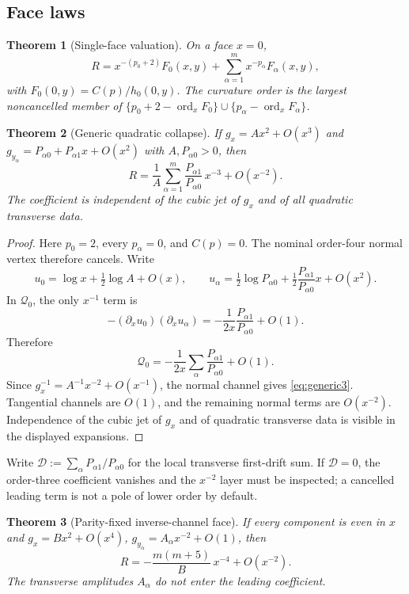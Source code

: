 \documentclass[11pt,a4paper]{article}
\newtheorem{theorem}{Theorem}[section]
\theoremstyle{definition}
\theoremstyle{remark}
\newcommand{\ord}{\operatorname{ord}}
\begin{document}
\subsection{Face laws}

\begin{theorem}[Single-face valuation]
\label{thm:singleface}
On a face \(x=0\),
\[
R
=
x^{-(p_0+2)}F_0(x,y)
+\sum_{\alpha=1}^{m}x^{-p_\alpha}F_\alpha(x,y),
\]
with \(F_0(0,y)=C(p)/h_0(0,y)\). The curvature order is the largest noncancelled
member of \(\{p_0+2-\ord_x F_0\}\cup\{p_\alpha-\ord_x F_\alpha\}\).
\end{theorem}

\begin{theorem}[Generic quadratic collapse]
\label{thm:generic3}
If \(g_x=Ax^2+O(x^3)\) and \(g_{y_\alpha}=P_{\alpha0}+P_{\alpha1}x+O(x^2)\) with
\(A,P_{\alpha0}>0\), then
\begin{equation}
\boxed{
R
=
\frac1A\sum_{\alpha=1}^{m}\frac{P_{\alpha1}}{P_{\alpha0}}\,x^{-3}
+O(x^{-2}).
}
\label{eq:generic3}
\end{equation}
The coefficient is independent of the cubic jet of \(g_x\) and of all quadratic
transverse data.
\end{theorem}

\begin{proof}
Here \(p_0=2\), every \(p_\alpha=0\), and \(C(p)=0\). The nominal order-four
normal vertex therefore cancels. Write
\[
u_0=\log x+\tfrac12\log A+O(x),
\qquad
u_\alpha
=
\tfrac12\log P_{\alpha0}
+\tfrac12\frac{P_{\alpha1}}{P_{\alpha0}}x
+O(x^2).
\]
In \(\mathcal Q_0\), the only \(x^{-1}\) term is
\[
-(\partial_xu_0)(\partial_xu_\alpha)
=
-\frac{1}{2x}\frac{P_{\alpha1}}{P_{\alpha0}}+O(1).
\]
Therefore
\[
\mathcal Q_0
=
-\frac{1}{2x}
\sum_\alpha\frac{P_{\alpha1}}{P_{\alpha0}}
+O(1).
\]
Since \(g_x^{-1}=A^{-1}x^{-2}+O(x^{-1})\), the normal channel gives
\eqref{eq:generic3}. Tangential channels are \(O(1)\), and the remaining normal
terms are \(O(x^{-2})\). Independence of the cubic jet of \(g_x\) and of
quadratic transverse data is visible in the displayed expansions.
\end{proof}

Write
\(\mathcal D:=\sum_\alpha P_{\alpha1}/P_{\alpha0}\)
for the local transverse first-drift sum. If \(\mathcal D=0\), the order-three
coefficient vanishes and the \(x^{-2}\) layer must be inspected; a cancelled
leading term is not a pole of lower order by default.

\begin{theorem}[Parity-fixed inverse-channel face]
\label{thm:parity4}
If every component is even in \(x\) and
\(g_x=Bx^2+O(x^4)\), \(g_{y_\alpha}=A_\alpha x^{-2}+O(1)\), then
\begin{equation}
\boxed{
R=-\frac{m(m+5)}{B}\,x^{-4}+O(x^{-2}).
}
\label{eq:parity4}
\end{equation}
The transverse amplitudes \(A_\alpha\) do not enter the leading coefficient.
\end{theorem}
\end{document}
